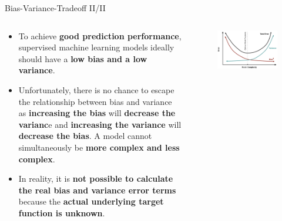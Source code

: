 \documentclass[main.tex]{subfiles}
\begin{document}
    \begin{frame}{Bias-Variance-Tradeoff II/II}
        \begin{columns}
            \begin{column}{0.6\textwidth}
                \begin{itemize}	
                    \item To achieve \textbf{good prediction performance}, supervised machine learning models ideally should have a \textbf{low bias and a low variance}.
                    \item Unfortunately, there is no chance to escape the relationship between bias and variance as \textbf{increasing the bias} will \textbf{decrease the varianc}e and \textbf{increasing the variance} will \textbf{decrease the bias}. A model cannot simultaneously be \textbf{more complex and less complex}.
                    \item In reality, it is \textbf{not possible to calculate the real bias and variance error terms} because the \textbf{actual underlying target function is unknown}.
                \end{itemize}
            \end{column}
            \begin{column}{0.4\textwidth}
                \begin{figure}
                    \label{fig:bias-variance-tradeoff-2}
                    \includegraphics[width=\textwidth, keepaspectratio]{figures/external/bias-variance-tradeoff-2.png}
                \end{figure}
            \end{column}
        \end{columns}
    \end{frame}
        
\end{document}
